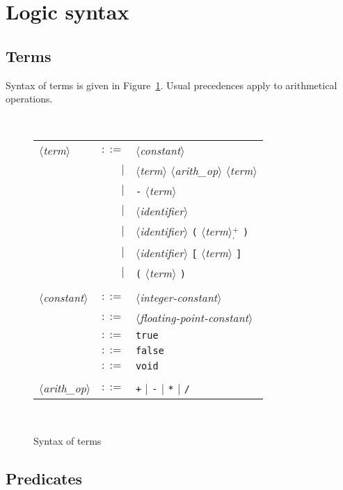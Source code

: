 \documentclass[a4paper,12pt]{report}
\newcommand{\te}[1]{\texttt{#1}}
\newcommand{\nt}[1]{$\langle$\textsl{#1}$\rangle$}
\newcommand{\plussep}[1]{$^+_#1$}
\begin{document}
\section{Logic syntax}
\label{syntax:logic}

\subsection{Terms}

Syntax of terms is given in Figure~\ref{fig:terms}.
Usual precedences apply to arithmetical operations.

\begin{figure}[htbp]
\begin{center}
\hrulefill\\
\begin{tabular}{lrl}
  \nt{term}
    & $::=$ & \nt{constant} \\
      & $|$ & \nt{term} \nt{arith\_op} \nt{term} \\
      & $|$ & \te{-} \nt{term} \\
      & $|$ & \nt{identifier} \\
      & $|$ & \nt{identifier} \te{(} \nt{term}\plussep{\te{,}} \te{)} \\
      & $|$ & \nt{identifier} \te{[} \nt{term} \te{]} \\
      & $|$ & \te{(} \nt{term} \te{)} \\
  \\[0.1em]

  \nt{constant}
    & $::=$ & \nt{integer-constant} \\
    & $::=$ & \nt{floating-point-constant} \\
    & $::=$ & \te{true} \\
    & $::=$ & \te{false} \\
    & $::=$ & \te{void} \\
  \\[0.1em]

  \nt{arith\_op}
    & $::=$ & \te{+} $|$ \te{-} $|$ \te{*} $|$ \te{/}
\end{tabular}\\
\hrulefill
\caption{Syntax of terms}
\label{fig:terms}
\end{center}            
\end{figure}

\subsection{Predicates}
\end{document}
